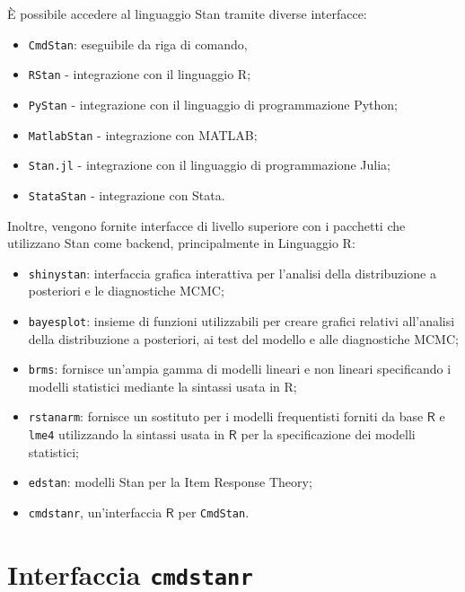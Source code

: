\documentclass[
]{memoir}
\providecommand{\tightlist}{%
  \setlength{\itemsep}{0pt}\setlength{\parskip}{0pt}}
\newcommand{\R}{\textsf{R}} %
\begin{document}
È possibile accedere al linguaggio Stan tramite diverse interfacce:

\begin{itemize}
\tightlist
\item
  \texttt{CmdStan}: eseguibile da riga di comando,
\item
  \texttt{RStan} - integrazione con il linguaggio \R;
\item
  \texttt{PyStan} - integrazione con il linguaggio di programmazione Python;
\item
  \texttt{MatlabStan} - integrazione con MATLAB;
\item
  \texttt{Stan.jl} - integrazione con il linguaggio di programmazione Julia;
\item
  \texttt{StataStan} - integrazione con Stata.
\end{itemize}

Inoltre, vengono fornite interfacce di livello superiore con i pacchetti che utilizzano Stan come backend, principalmente in Linguaggio \R:

\begin{itemize}
\tightlist
\item
  \texttt{shinystan}: interfaccia grafica interattiva per l'analisi della distribuzione a posteriori e le diagnostiche MCMC;\\
\item
  \texttt{bayesplot}: insieme di funzioni utilizzabili per creare grafici relativi all'analisi della distribuzione a posteriori, ai test del modello e alle diagnostiche MCMC;\\
\item
  \texttt{brms}: fornisce un'ampia gamma di modelli lineari e non lineari specificando i modelli statistici mediante la sintassi usata in \R;
\item
  \texttt{rstanarm}: fornisce un sostituto per i modelli frequentisti forniti da base \(\R\) e \texttt{lme4} utilizzando la sintassi usata in \(\R\) per la specificazione dei modelli statistici;
\item
  \texttt{edstan}: modelli Stan per la Item Response Theory;
\item
  \texttt{cmdstanr}, un'interfaccia \(\R\) per \texttt{CmdStan}.
\end{itemize}

\hypertarget{interfaccia-cmdstanr}{%
\section{\texorpdfstring{Interfaccia \texttt{cmdstanr}}{Interfaccia cmdstanr}}\label{interfaccia-cmdstanr}}
\end{document}
